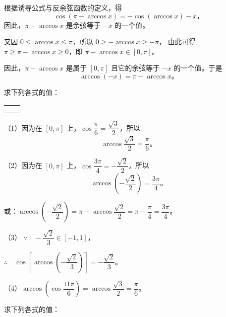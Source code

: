 根据诱导公式与反余弦函数的定义，得
$$\cos(\pi - \arccos x) = -\cos(\arccos x) - x \text{，}$$
因此，$\pi - \arccos x$ 是余弦等于 $-x$ 的一个值。

又因 $0 \leqslant \arccos x \leqslant \pi$，所以 $0 \geqslant -\arccos x \geqslant -\pi$，
由此可得 $\pi \geqslant \pi - \arccos x \geqslant 0$，即 $\pi - \arccos x \in [0, \pi]$。

因此，$\pi - \arccos x$ 是属于 $[0, \pi]$ 且它的余弦等于 $-x$ 的一个值。于是
$$\arccos(-x) = \pi - \arccos x \text{。}$$

\liti 求下列各式的值：
\begin{xiaoxiaotis}

    \renewcommand\arraystretch{1.8}
    \begin{tabular}[t]{*{2}{@{}p{16em}}}
         &  \\
         & 
    \end{tabular}

\end{xiaoxiaotis}

\jie （1）因为在 $[0, \pi]$ 上，$\cos\dfrac{\pi}{6} = \dfrac{\sqrt{3}}{2}$，所以
$$\arccos\dfrac{\sqrt{3}}{2} = \dfrac{\pi}{6} \text{。} $$

（2）因为在 $[0, \pi]$ 上，$\cos\dfrac{3\pi}{4} = -\dfrac{\sqrt{2}}{2}$，所以
$$\arccos \left( -\dfrac{\sqrt{2}}{2} \right) = \dfrac{3\pi}{4} \text{。}$$

或：$\arccos\left( -\dfrac{\sqrt{2}}{2} \right) = \pi - \arccos \dfrac{\sqrt{2}}{2} = \pi - \dfrac{\pi}{4} = \dfrac{3\pi}{4}$。

（3） $\because \quad -\dfrac{\sqrt{2}}{3} \in [-1, 1]$，

$\therefore \quad \cos \left[ \arccos\left( -\dfrac{\sqrt{2}}{3} \right)\right] = -\dfrac{\sqrt{2}}{3}$。

（4）$\arccos\left( \cos\dfrac{11\pi}{6} \right) = \arccos \dfrac{\sqrt{3}}{2} = \dfrac{\pi}{6}$。

\liti 求下列各式的值：
\begin{xiaoxiaotis}




\end{xiaoxiaotis}

